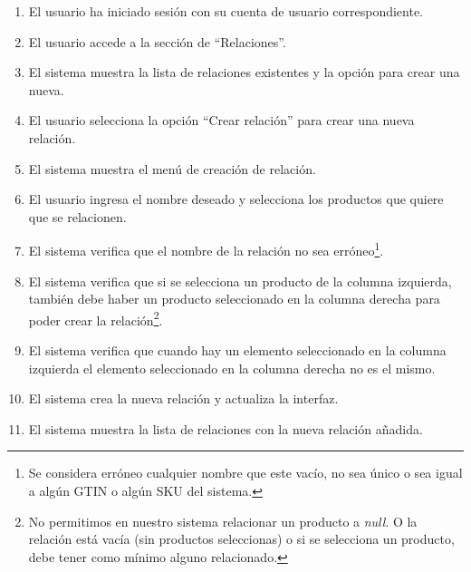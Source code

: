 \begin{enumerate}
    \item El usuario ha iniciado sesión con su cuenta de usuario correspondiente.
    \item El usuario accede a la sección de \enquote{Relaciones}.
    \item El sistema muestra la lista de relaciones existentes y la opción para crear una nueva.
    \item El usuario selecciona la opción \enquote{Crear relación} para crear una nueva relación.
    \item El sistema muestra el menú de creación de relación.
    \item El usuario ingresa el nombre deseado y selecciona los productos que quiere que se relacionen.
    \item El sistema verifica que el nombre de la relación no sea erróneo\footnote{Se considera erróneo cualquier nombre que este vacío, no sea único o sea igual a algún GTIN o algún SKU del sistema.}.
    \item El sistema verifica que si se selecciona un producto de la columna izquierda, también debe haber un producto seleccionado en la columna derecha para poder crear la relación\footnote{No permitimos en nuestro sistema relacionar un producto a \emph{null}. O la relación está vacía (sin productos seleccionas) o si se selecciona un producto, debe tener como mínimo alguno relacionado.}.
    \item El sistema verifica que cuando hay un elemento seleccionado en la columna izquierda el elemento seleccionado en la columna derecha no es el mismo.
    \item El sistema crea la nueva relación y actualiza la interfaz.
    \item El sistema muestra la lista de relaciones con la nueva relación añadida.
\end{enumerate}

